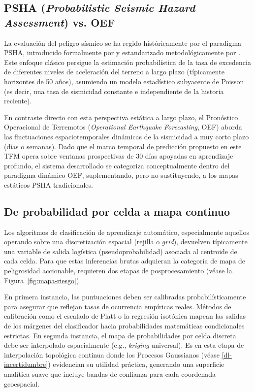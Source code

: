 \subsection{PSHA (\textit{Probabilistic Seismic Hazard Assessment}) vs. OEF}
La evaluación del peligro sísmico se ha regido históricamente por el paradigma PSHA, introducido formalmente por \citet{cornell1968engineering} y estandarizado metodológicamente por \citet{mcguire1995probabilistic}. Este enfoque clásico persigue la estimación probabilística de la tasa de excedencia de diferentes niveles de aceleración del terreno a largo plazo (típicamente horizontes de 50 años), asumiendo un modelo estadístico subyacente de Poisson (es decir, una tasa de sismicidad constante e independiente de la historia reciente).

En contraste directo con esta perspectiva estática a largo plazo, el Pronóstico Operacional de Terremotos (\textit{Operational Earthquake Forecasting}, OEF) \citep{jordan2011oef} aborda las fluctuaciones espaciotemporales dinámicas de la sismicidad a muy corto plazo (días o semanas). Dado que el marco temporal de predicción propuesto en este TFM opera sobre ventanas prospectivas de 30 días apoyadas en aprendizaje profundo, el sistema desarrollado se categoriza conceptualmente dentro del paradigma dinámico OEF, suplementando, pero no sustituyendo, a los mapas estáticos PSHA tradicionales.

\subsection{De probabilidad por celda a mapa continuo}
Los algoritmos de clasificación de aprendizaje automático, especialmente aquellos operando sobre una discretización espacial (rejilla o \textit{grid}), devuelven típicamente una variable de salida logística (pseudoprobabilidad) asociada al centroide de cada celda. Para que estas inferencias brutas adquieran la categoría de mapa de peligrosidad accionable, requieren dos etapas de posprocesamiento (véase la Figura~\ref{fig:mapa-riesgo}).

En primera instancia, las puntuaciones deben ser calibradas probabilísticamente para asegurar que reflejan tasas de ocurrencia empíricas reales. Métodos de calibración como el escalado de Platt \citep{platt1999probabilistic} o la regresión isotónica mapean las salidas de los márgenes del clasificador hacia probabilidades matemáticas condicionales estrictas. En segunda instancia, el mapa de probabilidades por celda discreta debe ser interpolado espacialmente (e.g., \textit{kriging} universal). Es en esta etapa de interpolación topológica continua donde los Procesos Gaussianos (véase \ref{dl-incertidumbre}) evidencian su utilidad práctica, generando una superficie analítica suave que incluye bandas de confianza para cada coordenada geoespacial.


